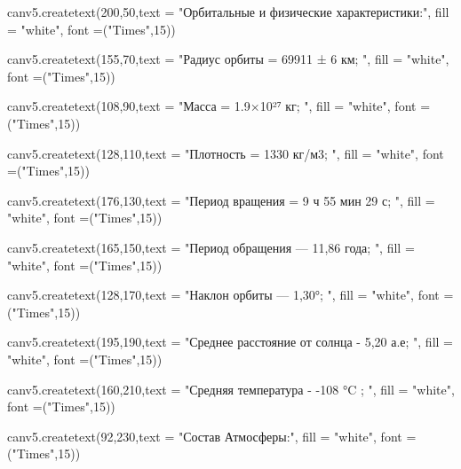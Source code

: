 \documentclass[14pt, oneside]{SavkinSeliverstov}
\begin{document}
	canv\underline{\hspace{0.2cm}}5.create\underline{\hspace{0.2cm}}text(200,50,text = "Орбитальные и физические характеристики:", fill = "white", font =("Times",15))

	canv\underline{\hspace{0.2cm}}5.create\underline{\hspace{0.2cm}}text(155,70,text = "Радиус орбиты = 69911 ± 6 км; ", fill = "white", font =("Times",15))

	canv\underline{\hspace{0.2cm}}5.create\underline{\hspace{0.2cm}}text(108,90,text = "Масса = 1.9×10²⁷ кг; ", fill = "white", font =("Times",15))

	canv\underline{\hspace{0.2cm}}5.create\underline{\hspace{0.2cm}}text(128,110,text = "Плотность = 1330 кг/м3; ", fill = "white", font =("Times",15))
	
	canv\underline{\hspace{0.2cm}}5.create\underline{\hspace{0.2cm}}text(176,130,text = "Период вращения = 9 ч 55 мин 29 с; ", fill = "white", font =("Times",15))
	
	canv\underline{\hspace{0.2cm}}5.create\underline{\hspace{0.2cm}}text(165,150,text = "Период обращения — 11,86 года; ", fill = "white", font =("Times",15))

	canv\underline{\hspace{0.2cm}}5.create\underline{\hspace{0.2cm}}text(128,170,text = "Наклон орбиты — 1,30°; ", fill = "white", font =("Times",15))

	canv\underline{\hspace{0.2cm}}5.create\underline{\hspace{0.2cm}}text(195,190,text = "Среднее расстояние от солнца - 5,20 а.е; ", fill = "white", font =("Times",15))
	
	canv\underline{\hspace{0.2cm}}5.create\underline{\hspace{0.2cm}}text(160,210,text = "Средняя температура - -108  °C ; ", fill = "white", font =("Times",15))
	
	canv\underline{\hspace{0.2cm}}5.create\underline{\hspace{0.2cm}}text(92,230,text = "Состав Атмосферы:", fill = "white", font =("Times",15))
	
\end{document}
